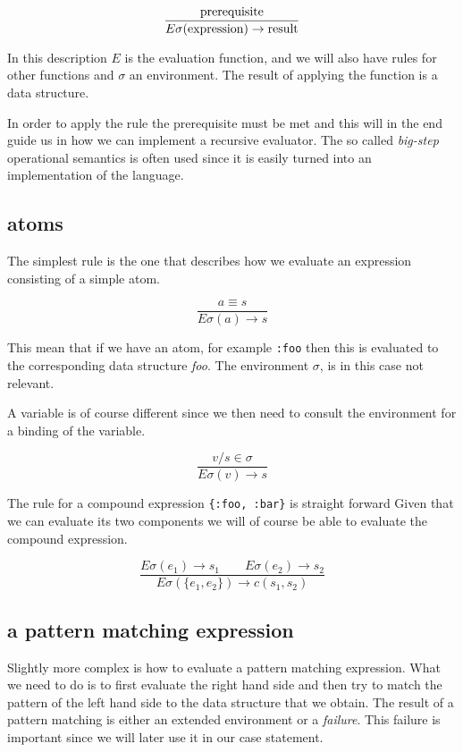 \documentclass[a4paper,11pt]{article}
\begin{document}
$$\frac{{\rm prerequisite}}{E\sigma({\rm expression}) \rightarrow {\rm result}}$$

In this description $E$ is the evaluation function, and we will also
have rules for other functions and $\sigma$ an environment. The result
of applying the function is a data structure.

In order to apply the rule the prerequisite must be met and this will
in the end guide us in how we can implement a recursive evaluator. The
so called {\em big-step} operational semantics is often used since it
is easily turned into an implementation of the language.

\subsection{atoms}

The simplest rule is the one that describes how we evaluate an
expression consisting of a simple atom.

$$\frac{a \equiv s}{E\sigma(a) \rightarrow s}$$  

This mean that if we have an atom, for example {\tt :foo} then this is
evaluated to the corresponding data structure {\em foo}. The
environment $\sigma$, is in this case not relevant. 

A variable is of course different since we then need to consult the
environment for a binding of the variable.

   $$\frac{v/s \in \sigma}{E\sigma(v) \rightarrow s}$$

The rule for a compound expression {\tt \{:foo, :bar\}} is straight
forward Given that we can evaluate its two components we will of
course be able to evaluate the compound expression.

$$\frac{ E\sigma(e_1) \rightarrow s_1 \qquad   E\sigma(e_2) \rightarrow s_2}{E\sigma(\lbrace e_1 , e_2\rbrace) \rightarrow c(s_1, s_2)}$$

\subsection{a pattern matching expression}

Slightly more complex is how to evaluate a pattern matching
expression. What we need to do is to first evaluate the right hand
side and then try to match the pattern of the left hand side to the
data structure that we obtain. The result of a pattern matching is
either an extended environment or a {\em failure}. This failure is
important since we will later use it in our case statement.
\end{document}
